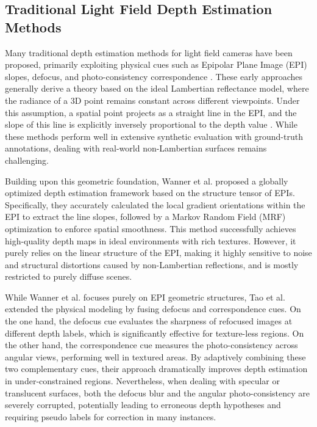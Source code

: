 \documentclass[lettersize,journal]{IEEEtran}
\begin{document}
\subsection{Traditional Light Field Depth Estimation Methods}

Many traditional depth estimation methods for light field cameras have been proposed, primarily exploiting physical cues such as Epipolar Plane Image (EPI) slopes, defocus, and photo-consistency correspondence \cite{visionappl}. These early approaches generally derive a theory based on the ideal Lambertian reflectance model, where the radiance of a 3D point remains constant across different viewpoints. Under this assumption, a spatial point projects as a straight line in the EPI, and the slope of this line is explicitly inversely proportional to the depth value \cite{lamberassu}. While these methods perform well in extensive synthetic evaluation with ground-truth annotations, dealing with real-world non-Lambertian surfaces remains challenging.

Building upon this geometric foundation, Wanner et al. \cite{wannerstru} proposed a globally optimized depth estimation framework based on the structure tensor of EPIs. Specifically, they accurately calculated the local gradient orientations within the EPI to extract the line slopes, followed by a Markov Random Field (MRF) optimization to enforce spatial smoothness. This method successfully achieves high-quality depth maps in ideal environments with rich textures. However, it purely relies on the linear structure of the EPI, making it highly sensitive to noise and structural distortions caused by non-Lambertian reflections, and is mostly restricted to purely diffuse scenes.

While Wanner et al. focuses purely on EPI geometric structures, Tao et al. \cite{taodefo} extended the physical modeling by fusing defocus and correspondence cues. On the one hand, the defocus cue evaluates the sharpness of refocused images at different depth labels, which is significantly effective for texture-less regions. On the other hand, the correspondence cue measures the photo-consistency across angular views, performing well in textured areas. By adaptively combining these two complementary cues, their approach dramatically improves depth estimation in under-constrained regions. Nevertheless, when dealing with specular or translucent surfaces, both the defocus blur and the angular photo-consistency are severely corrupted, potentially leading to erroneous depth hypotheses and requiring pseudo labels for correction in many instances.
\end{document}
